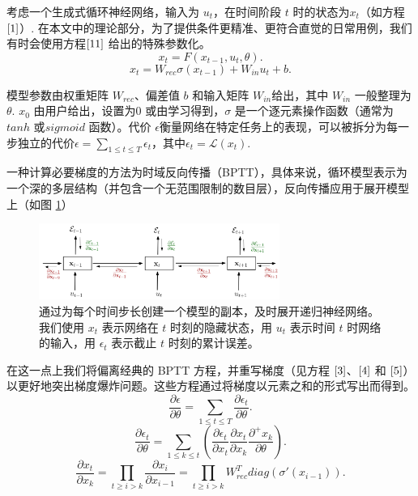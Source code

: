 考虑一个生成式循环神经网络，输入为 \(u_t\)，在时间阶段 \(t\) 时的状态为\(x_t\)（如方程\(\eqref{1}\)）. 在本文中的理论部分，为了提供条件更精准、更符合直觉的日常用例，我们有时会使用方程\(\eqref{11}\) 给出的特殊参数化。
\begin{equation}\label{1}
  x_t = F(x_{t-1}, u_t, \theta).
\end{equation}
\begin{equation}\label{2}
  x_t = W_{rec}\sigma(x_{t-1})+W_{in}u_t+b.
\end{equation}

模型参数由权重矩阵 \(W_{rec}\)、偏差值 \(b\) 和输入矩阵 \(W_{in}\)给出，其中 \(W_{in}\) 一般整理为 \(\theta\). \(x_0\) 由用户给出，设置为0 或由学习得到，\(\sigma\) 是一个逐元素操作函数（通常为 \(tanh\) 或\(sigmoid\) 函数）。代价 \(\epsilon\)衡量网络在特定任务上的表现，可以被拆分为每一步独立的代价\(\epsilon = \sum_{1\leq t\leq T}\epsilon_t\)，其中\(\epsilon_t = \mathcal{L}(x_t)\).

一种计算必要梯度的方法为时域反向传播（BPTT），具体来说，循环模型表示为一个深的多层结构（并包含一个无范围限制的数目层），反向传播应用于展开模型上（如图 \ref{fig:bptt}）

\begin{figure}[htbp]
  \centering
  \includegraphics[width=0.7\textwidth]{figures/IMG_0429.jpg}
  \caption{通过为每个时间步长创建一个模型的副本，及时展开递归神经网络。我们使用
    \(x_t\) 表示网络在 \(t\) 时刻的隐藏状态，用 \(u_t\) 表示时间 \(t\)
    时网络的输入，用 \(\epsilon_t\) 表示截止 \(t\) 时刻的累计误差。}
  \label{fig:bptt}
\end{figure}

在这一点上我们将偏离经典的 BPTT 方程，并重写梯度（见方程 \(\eqref{3}\)、\(\eqref{4}\) 和 \(\eqref{5}\)）以更好地突出梯度爆炸问题。这些方程通过将梯度以元素之和的形式写出而得到。
\begin{equation}\label{3}
  \frac{\partial\epsilon}{\partial\theta} = \sum_{1\leq t\leq T}\frac{\partial \epsilon_t}{\partial\theta}.
\end{equation}
\begin{equation}\label{4}
  \frac{\partial\epsilon_t}{\partial\theta}=\sum_{1\leq k\leq t}(\frac{\partial\epsilon_t}{\partial x_t}\frac{\partial x_t}{\partial x_k}\frac{\partial^+x_k}{\partial\theta}).
\end{equation}
\begin{equation}\label{5}
  \frac{\partial x_t}{\partial x_k}=\prod_{t\geq i>k}\frac{\partial x_i}{\partial x_{i-1}}=\prod_{t\geq i>k}W^T_{rec}diag(\sigma'(x_{i-1})).
\end{equation}

